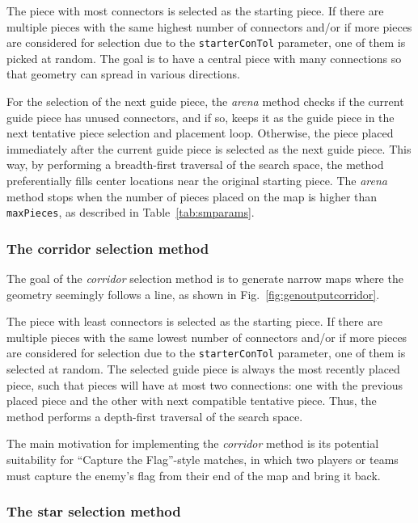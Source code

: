 \documentclass[journal]{IEEEtran}
\begin{document}
The piece with most connectors is selected as the starting piece. If there are multiple
pieces with the same highest number of connectors and/or if more pieces are considered
for selection due to the \texttt{starterConTol} parameter, one of them is picked at random.
The goal is to have a central piece with many connections so that geometry can spread in
various directions.

For the selection of the next guide piece, the \emph{arena} method checks if the current
guide piece has unused connectors, and if so, keeps it as the guide piece in the next
tentative piece selection and placement loop. Otherwise, the piece placed immediately
after the current guide piece is selected as the next guide piece. This way, by
performing a breadth-first traversal of the search space, the method preferentially
fills center locations near the original starting piece. The \emph{arena} method
stops when the number of pieces placed on the map is higher than \texttt{maxPieces}, as
described in Table~\ref{tab:smparams}.

\subsubsection{The corridor selection method}
\label{sec:methods:selmethods:corridor}

The goal of the \emph{corridor} selection method is to generate narrow maps where the
geometry seemingly follows a line, as shown in Fig.~\ref{fig:genoutputcorridor}.

The piece with least connectors is selected as the starting piece. If there are multiple
pieces with the same lowest number of connectors and/or if more pieces are considered
for selection due to the \texttt{starterConTol} parameter, one of them is selected at
random. The selected guide piece is always the most recently placed piece, such that
pieces will have at most two connections: one with the previous placed piece and the
other with next compatible tentative piece. Thus, the method performs a depth-first
traversal of the search space.

The main motivation for implementing the \emph{corridor} method is its potential
suitability for ``Capture the Flag''-style matches, in which two players or teams must
capture the enemy's flag from their end of the map and bring it back.

\subsubsection{The star selection method}
\label{sec:methods:selmethods:star}
\end{document}
